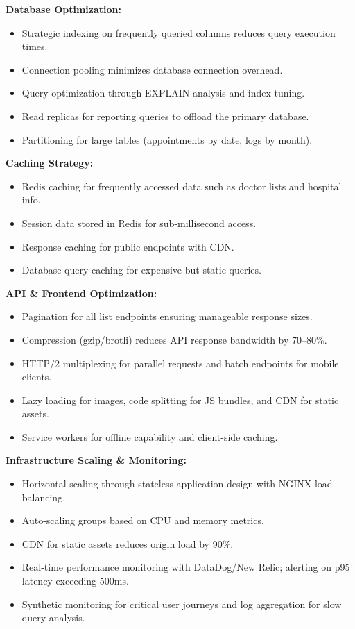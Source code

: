 \textbf{Database Optimization:}
\begin{itemize}
    \item Strategic indexing on frequently queried columns reduces query execution times.
    \item Connection pooling minimizes database connection overhead.
    \item Query optimization through EXPLAIN analysis and index tuning.
    \item Read replicas for reporting queries to offload the primary database.
    \item Partitioning for large tables (appointments by date, logs by month).
\end{itemize}

\textbf{Caching Strategy:}
\begin{itemize}
    \item Redis caching for frequently accessed data such as doctor lists and hospital info.
    \item Session data stored in Redis for sub-millisecond access.
    \item Response caching for public endpoints with CDN.
    \item Database query caching for expensive but static queries.
\end{itemize}

\textbf{API \& Frontend Optimization:}
\begin{itemize}
    \item Pagination for all list endpoints ensuring manageable response sizes.
    \item Compression (gzip/brotli) reduces API response bandwidth by 70--80\%.
    \item HTTP/2 multiplexing for parallel requests and batch endpoints for mobile clients.
    \item Lazy loading for images, code splitting for JS bundles, and CDN for static assets.
    \item Service workers for offline capability and client-side caching.
\end{itemize}

\textbf{Infrastructure Scaling \& Monitoring:}
\begin{itemize}
    \item Horizontal scaling through stateless application design with NGINX load balancing.
    \item Auto-scaling groups based on CPU and memory metrics.
    \item CDN for static assets reduces origin load by 90\%.
    \item Real-time performance monitoring with DataDog/New Relic; alerting on p95 latency
    exceeding 500ms.
    \item Synthetic monitoring for critical user journeys and log aggregation for slow query
    analysis.
\end{itemize}

